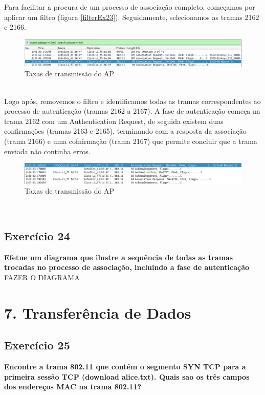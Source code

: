 \documentclass[a4paper]{report}
\begin{document}
Para facilitar a procura de um processo de associação completo, começamos por aplicar
um filtro (figura \ref{filterEx23}). Seguidamente, selecionamos as tramas 2162 e 2166.

\begin{figure}[H]
    \centering 
    \includegraphics[width=\textwidth]{images/filterEx23.png}  
    \caption{Taxas de transmissão do AP}
    \label{fig:filterEx23}
\end{figure}\\

Logo após, removemos o filtro e identificamos todas as tramas correspondentes ao processo 
de autenticação (tramas 2162 a 2167). A fase de autenticação começa na trama 2162 com um 
Authentication Request, de seguida existem duas confirmações (tramas 2163 e 2165),
terminando com a resposta da associação (trama 2166) e uma cofnirmação (trama 2167) que 
permite concluir que a trama enviada não continha erros.

\begin{figure}[H]
    \centering 
    \includegraphics[width=\textwidth]{images/nofilterEx23.png}  
    \caption{Taxas de transmissão do AP}
    \label{fig:nofilterEx23}
\end{figure}\\

\section{Exercício 24}
\textbf{Efetue um diagrama que ilustre a sequência de todas as tramas trocadas
    no processo de associação, incluindo a fase de autenticação}\\

FAZER O DIAGRAMA

\chapter{7. Transferência de Dados}

\section{Exercício 25}
\textbf{Encontre a trama 802.11 que contém o segmento SYN TCP para a primeira
    sessão TCP (download alice.txt). Quais sao os três campos dos endereços MAC
    na trama 802.11?}\\
\end{document}
